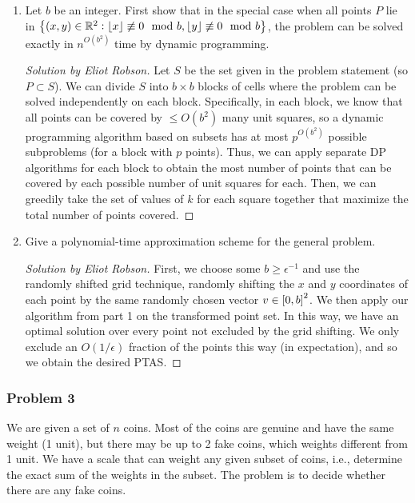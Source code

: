 \documentclass{article}
\newenvironment{solution}[1]{\begin{proof}[Solution by #1]}{\end{proof}}
\newcommand{\floor}[1]{\left\lfloor#1\right\rfloor} %
\newcommand{\Reals}{\mathbb{R}}
\begin{document}
\begin{enumerate}
    \item Let \(b\) be an integer. First show that in the special case when all points \(P\) lie in \(\set{(x,y) \in \Reals^2 : \floor{x} \not\equiv 0 \mod b, \floor{y} \not\equiv 0 \mod b}\), the problem can be solved exactly in \(n^{O(b^2)}\) time by dynamic programming.
    
    \begin{solution}{Eliot Robson}
        Let \(S\) be the set given in the problem statement (so \(P \subset S\)). We can divide \(S\) into \(b \times b\) blocks of cells where the problem can be solved independently on each block. Specifically, in each block, we know that all points can be covered by \(\leq O(b^2)\) many unit squares, so a dynamic programming algorithm based on subsets has at most \(p^{O(b^2)}\) possible subproblems (for a block with \(p\) points). Thus, we can apply separate DP algorithms for each block to obtain the most number of points that can be covered by each possible number of unit squares for each. Then, we can greedily take the set of values of \(k\) for each square together that maximize the total number of points covered.
    \end{solution}
    
    \item Give a polynomial-time approximation scheme for the general problem.
    
    \begin{solution}{Eliot Robson}
    	First, we choose some \(b \geq \epsilon^{-1}\) and use the randomly shifted grid technique, randomly shifting the \(x\) and \(y\) coordinates of each point by the same randomly chosen vector \(v \in \sbr{0,b}^2\). We then apply our algorithm from part 1 on the transformed point set. In this way, we have an optimal solution over every point not excluded by the grid shifting. We only exclude an \(O(1 / \epsilon)\) fraction of the points this way (in expectation), and so we obtain the desired PTAS.
    \end{solution}
\end{enumerate}

\subsubsection{Problem 3}
We are given a set of \(n\) coins. Most of the coins are genuine and have the same weight (1 unit), but there may be up to 2 fake coins, which weights different from 1 unit. We have a scale that can weight any given subset of coins, i.e., determine the exact sum of the weights in the subset. The problem is to decide whether there are any fake coins. %
\end{document}
